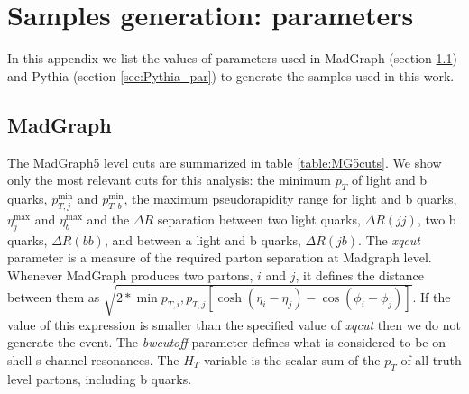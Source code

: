 
\chapter{Samples generation: parameters}
\label{chapter:samples_gen}

In this appendix we list the values of parameters used in MadGraph (section \ref{sec:MG_par}) and Pythia (section \ref{sec:Pythia_par}) to generate the samples used in this work. 

\section{MadGraph}
\label{sec:MG_par}

The MadGraph5 level cuts are summarized in table \ref{table:MG5cuts}. We show only the most relevant cuts for this analysis: the minimum $p_T$ of light and b quarks, $p_{T,j}^{\min}$ and $p_{T,b}^{\min}$, the maximum pseudorapidity range for light and b quarks, $\eta_j^{\max}$ and $\eta_b^{\max}$ and the $\Delta R$ separation between two light quarks, $\Delta R(jj)$, two b quarks, $\Delta R(bb)$, and between a light and b quarks, $\Delta R(jb)$. The \textit{xqcut} parameter is a measure of the required parton separation at Madgraph level. Whenever MadGraph produces two partons, $i$ and $j$, it defines the distance between them as $\sqrt{2*\min{p_{T,i},p_{T,j}}[\cosh{(\eta_i-\eta_j)}-\cos{(\phi_i-\phi_j)}]}$. If the value of this expression is smaller than the specified value of \textit{xqcut} then we do not generate the event. The \textit{bwcutoff} parameter defines what is considered to be on-shell s-channel resonances. The $H_T$ variable is the scalar sum of the $p_T$ of all truth level partons, including b quarks.

